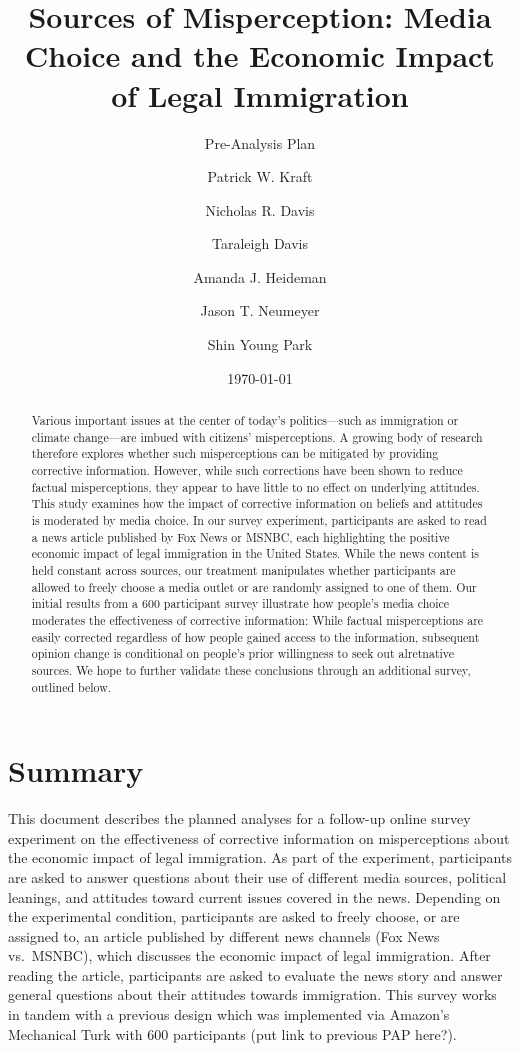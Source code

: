 \documentclass[
]{article}
\title{Sources of Misperception: Media Choice and the Economic Impact of
Legal Immigration}
\subtitle{Pre-Analysis Plan}
\author{Patrick W. Kraft \and Nicholas R. Davis \and Taraleigh
Davis \and Amanda J. Heideman \and Jason T. Neumeyer \and Shin Young
Park}
\date{\today}
\begin{document}
\maketitle
\begin{abstract}
Various important issues at the center of today's politics---such as
immigration or climate change---are imbued with citizens'
misperceptions. A growing body of research therefore explores whether
such misperceptions can be mitigated by providing corrective
information. However, while such corrections have been shown to reduce
factual misperceptions, they appear to have little to no effect on
underlying attitudes. This study examines how the impact of corrective
information on beliefs and attitudes is moderated by media choice. In
our survey experiment, participants are asked to read a news article
published by Fox News or MSNBC, each highlighting the positive economic
impact of legal immigration in the United States. While the news content
is held constant across sources, our treatment manipulates whether
participants are allowed to freely choose a media outlet or are randomly
assigned to one of them. Our initial results from a 600 participant
survey illustrate how people's media choice moderates the effectiveness
of corrective information: While factual misperceptions are easily
corrected regardless of how people gained access to the information,
subsequent opinion change is conditional on people's prior willingness
to seek out alretnative sources. We hope to further validate these
conclusions through an additional survey, outlined below.
\end{abstract}

\hypertarget{summary}{%
\section{Summary}\label{summary}}

This document describes the planned analyses for a follow-up online
survey experiment on the effectiveness of corrective information on
misperceptions about the economic impact of legal immigration. As part
of the experiment, participants are asked to answer questions about
their use of different media sources, political leanings, and attitudes
toward current issues covered in the news. Depending on the experimental
condition, participants are asked to freely choose, or are assigned to,
an article published by different news channels (Fox News vs.~MSNBC),
which discusses the economic impact of legal immigration. After reading
the article, participants are asked to evaluate the news story and
answer general questions about their attitudes towards immigration. This
survey works in tandem with a previous design which was implemented via
Amazon's Mechanical Turk with 600 participants (put link to previous PAP
here?).
\end{document}
